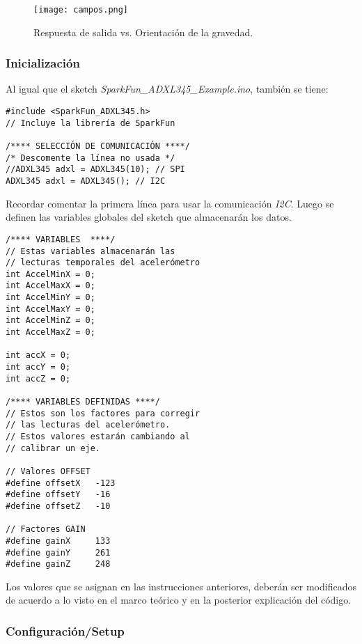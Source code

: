 \documentclass[10pt, a4paper, twocolumn]{article} %
\begin{document}
\begin{figure}[htbp]
	\begin{center}
		\texttt{[image: campos.png]} %
		\caption{Respuesta de salida vs. Orientación de la gravedad.}
		\label{fig:campos}
	\end{center}
\end{figure}

\subsubsection{Inicialización}

Al igual que el sketch \textit{SparkFun\_ADXL345\_Example.ino}, también se tiene:

\begin{verbatim}
#include <SparkFun_ADXL345.h>
// Incluye la librería de SparkFun

/**** SELECCIÓN DE COMUNICACIÓN ****/
/* Descomente la línea no usada */
//ADXL345 adxl = ADXL345(10); // SPI 
ADXL345 adxl = ADXL345(); // I2C 
\end{verbatim}

Recordar comentar la primera línea para usar la comunicación \textit{I2C}. Luego se definen las variables globales del sketch que almacenarán los datos.

\begin{verbatim}
/**** VARIABLES	 ****/
// Estas variables almacenarán las
// lecturas temporales del acelerómetro
int AccelMinX = 0;
int AccelMaxX = 0;
int AccelMinY = 0;
int AccelMaxY = 0;
int AccelMinZ = 0;
int AccelMaxZ = 0; 

int accX = 0;
int accY = 0;
int accZ = 0;

/**** VARIABLES DEFINIDAS ****/
// Estos son los factores para corregir
// las lecturas del acelerómetro.
// Estos valores estarán cambiando al
// calibrar un eje.

// Valores OFFSET
#define offsetX   -123       
#define offsetY   -16
#define offsetZ   -10

// Factores GAIN
#define gainX     133
#define gainY     261
#define gainZ     248

\end{verbatim}

Los valores que se asignan en las instrucciones anteriores, deberán ser modificados de acuerdo a lo visto en el marco teórico y en la posterior explicación del código.

\subsubsection{Configuración/Setup}
\end{document}
